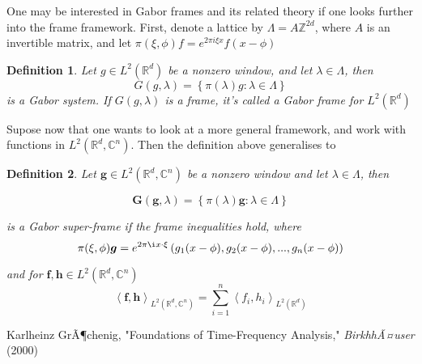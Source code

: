 \documentclass[12pt]{article}
\newtheorem*{defn}{Definition}
\begin{document}
\noindent One may be interested in Gabor frames and its related theory if one looks further into the frame framework. First, denote a lattice by $\Lambda=A \mathbb{Z}^{2d}$, where $A$ is an invertible matrix, and let $\pi(\xi,\phi)f=e^{2 \pi i \xi x}f(x-\phi)$

\begin{defn}
Let $g \in L^2(\mathbb{R}^d)$ be a nonzero window, and let $\lambda \in \Lambda$, then
\begin{equation*}
G(g,\lambda)=\left\{ \pi(\lambda)g : \lambda \in \Lambda \right\}
\end{equation*}
\noindent is a Gabor system. If $G(g,\lambda)$ is a frame, it's called a Gabor frame for $L^2(\mathbb{R}^d)$


\end{defn}

Supose now that one wants to look at a more general framework, and work with functions in $L^2(\mathbb{R}^d,\mathbb{C}^n)$. Then the definition above generalises to

\begin{defn}
Let $\boldsymbol{g} \in L^2(\mathbb{R}^d,\mathbb{C}^n)$ be a nonzero window and let $\lambda \in \Lambda$, then

\begin{equation*}
\boldsymbol{G}(\boldsymbol{g},\lambda)=\left\{ \pi(\lambda) \boldsymbol{g} : \lambda \in \Lambda \right\}
\end{equation*}

\noindent is a Gabor super-frame if the frame inequalities hold, where
\[ 
\pi( \xi, \phi ) \boldsymbol{g}=e^{2 \pi \i x \cdot \xi}\left( g_1(x-\phi),g_2(x-\phi),...,g_n(x-\phi) \right)
\]

\noindent and for $ \boldsymbol{f},\boldsymbol{h} \in L^2(\mathbb{R}^d,\mathbb{C}^n) $
\[
\left\langle \boldsymbol{f},\boldsymbol{h} \right\rangle_{L^2(\mathbb{R}^d,\mathbb{C}^n)} 
= \sum_{i=1}^n \left\langle f_i , h_i \right\rangle_{L^2(\mathbb{R}^d)}
\]


\end{defn}



\begin{thebibliography}{1}
 Karlheinz GrÃ¶chenig, "Foundations of Time-Frequency Analysis," {\it BirkhhÃ¤user} (2000)
\end{thebibliography}
\end{document}
